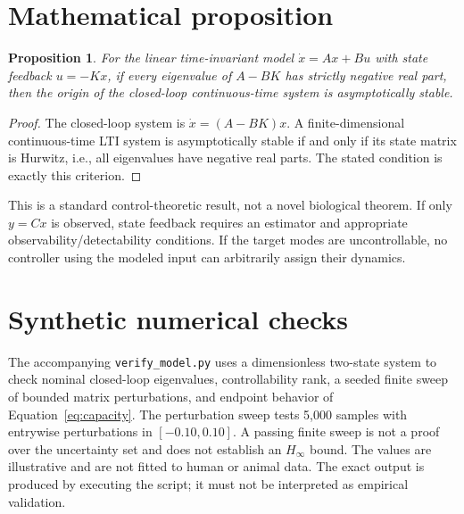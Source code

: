 \documentclass[11pt]{article}
\newtheorem{proposition}{Proposition}
\begin{document}
\section{Mathematical proposition}
\begin{proposition}
For the linear time-invariant model $\dot{x}=Ax+Bu$ with state feedback $u=-Kx$, if every eigenvalue of $A-BK$ has strictly negative real part, then the origin of the closed-loop continuous-time system is asymptotically stable.
\end{proposition}
\begin{proof}
The closed-loop system is $\dot{x}=(A-BK)x$. A finite-dimensional continuous-time LTI system is asymptotically stable if and only if its state matrix is Hurwitz, i.e., all eigenvalues have negative real parts. The stated condition is exactly this criterion.
\end{proof}
This is a standard control-theoretic result, not a novel biological theorem. If only $y=Cx$ is observed, state feedback requires an estimator and appropriate observability/detectability conditions. If the target modes are uncontrollable, no controller using the modeled input can arbitrarily assign their dynamics.

\section{Synthetic numerical checks}
The accompanying \texttt{verify\_model.py} uses a dimensionless two-state system to check nominal closed-loop eigenvalues, controllability rank, a seeded finite sweep of bounded matrix perturbations, and endpoint behavior of Equation~\eqref{eq:capacity}. The perturbation sweep tests 5,000 samples with entrywise perturbations in $[-0.10,0.10]$. A passing finite sweep is not a proof over the uncertainty set and does not establish an $H_\infty$ bound. The values are illustrative and are not fitted to human or animal data. The exact output is produced by executing the script; it must not be interpreted as empirical validation.
\end{document}
